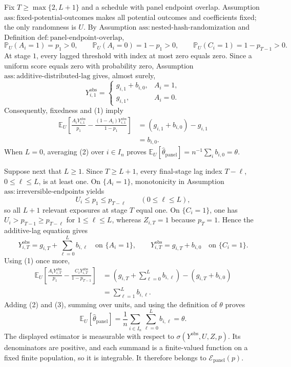 Fix \(T\geq\max\{2,L+1\}\) and a schedule with panel endpoint overlap.  Assumption \(\mathrm{ass:fixed\text{-}potential\text{-}outcomes}\) makes all potential outcomes and coefficients fixed; the only randomness is \(U\).  By Assumption \(\mathrm{ass:nested\text{-}hash\text{-}randomization}\) and Definition \(\mathrm{def:panel\text{-}endpoint\text{-}overlap}\),
\[
 \mathbb P_U(A_i=1)=p_1>0,
 \qquad
 \mathbb P_U(A_i=0)=1-p_1>0,
 \qquad
 \mathbb P_U(C_i=1)=1-p_{T-1}>0.
 \tag{1}
\]
At stage \(1\), every lagged threshold with index at most zero equals zero.  Since a uniform score equals zero with probability zero, Assumption \(\mathrm{ass:additive\text{-}distributed\text{-}lag}\) gives, almost surely,
\[
 Y^{\mathrm{obs}}_{i,1}
 =\begin{cases}
 g_{i,1}+b_{i,0},&A_i=1,\\
 g_{i,1},&A_i=0.
 \end{cases}
\]
Consequently, fixedness and (1) imply
\[
\begin{aligned}
 \mathbb E_U\!\left[
 \frac{A_iY^{\mathrm{obs}}_{i,1}}{p_1}
 -\frac{(1-A_i)Y^{\mathrm{obs}}_{i,1}}{1-p_1}
 \right]
 &=(g_{i,1}+b_{i,0})-g_{i,1}\\
 &=b_{i,0}.
\end{aligned}
\tag{2}
\]
When \(L=0\), averaging (2) over \(i\in I_n\) proves \(\mathbb E_U[\widehat\theta_{\mathrm{panel}}]=n^{-1}\sum_i b_{i,0}=\theta\).

Suppose next that \(L\geq1\).  Since \(T\geq L+1\), every final-stage lag index \(T-\ell\), \(0\leq\ell\leq L\), is at least one.  On \(\{A_i=1\}\), monotonicity in Assumption \(\mathrm{ass:irreversible\text{-}endpoints}\) yields
\[
 U_i\leq p_1\leq p_{T-\ell}
 \qquad(0\leq\ell\leq L),
\]
so all \(L+1\) relevant exposures at stage \(T\) equal one.  On \(\{C_i=1\}\), one has \(U_i>p_{T-1}\geq p_{T-\ell}\) for \(1\leq\ell\leq L\), whereas \(Z_{i,T}=1\) because \(p_T=1\).  Hence the additive-lag equation gives
\[
 Y^{\mathrm{obs}}_{i,T}
 =g_{i,T}+\sum_{\ell=0}^{L}b_{i,\ell}
 \quad\text{on }\{A_i=1\},
 \qquad
 Y^{\mathrm{obs}}_{i,T}=g_{i,T}+b_{i,0}
 \quad\text{on }\{C_i=1\}.
\]
Using (1) once more,
\[
\begin{aligned}
 \mathbb E_U\!\left[
 \frac{A_iY^{\mathrm{obs}}_{i,T}}{p_1}
 -\frac{C_iY^{\mathrm{obs}}_{i,T}}{1-p_{T-1}}
 \right]
 &=\left(g_{i,T}+\sum_{\ell=0}^{L}b_{i,\ell}\right)
   -(g_{i,T}+b_{i,0})\\
 &=\sum_{\ell=1}^{L}b_{i,\ell}.
\end{aligned}
\tag{3}
\]
Adding (2) and (3), summing over units, and using the definition of \(\theta\) proves
\[
 \mathbb E_U[\widehat\theta_{\mathrm{panel}}]
 =\frac1n\sum_{i\in I_n}\sum_{\ell=0}^{L}b_{i,\ell}
 =\theta.
\]
The displayed estimator is measurable with respect to \(\sigma(Y^{\mathrm{obs}},U,Z,p)\).  Its denominators are positive, and each summand is a finite-valued function on a fixed finite population, so it is integrable.  It therefore belongs to \(\mathcal E_{\mathrm{panel}}(p)\).

